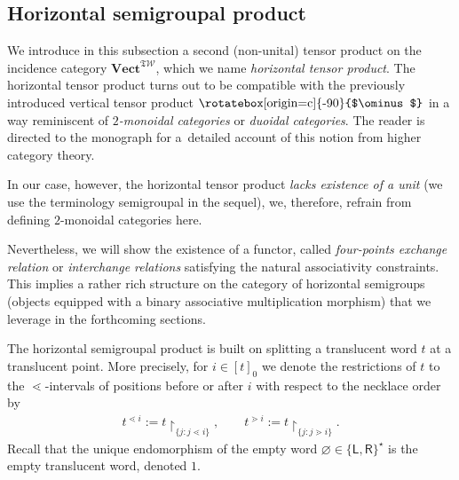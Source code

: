 \documentclass[pdftex]{sigma}
\newcommand\overt{\mathbin{\text{\rotatebox[origin=c]{-90}{$\ominus$}}}}
\renewcommand{\restriction}[2]{{#1\mathbin{\upharpoonright}_{#2}}}
\newcommand{\stdl}{\lessdot}
\newcommand{\stdg}{\gtrdot}
\newcommand{\SWc}{{\mathfrak{T}\mathcal{W}}}
\newcommand\LL{{\mathsf{L}}}
\newcommand\RR{{\mathsf{R}}}
\newcommand\CAT[1]{\mathbf{#1}}
\newcommand{\Vect}{\CAT{Vect}}
\newcommand\icsw{ \Vect^{\SWc} }
\numberwithin{equation}{section}
\begin{document}
\subsection{Horizontal semigroupal product}

We introduce in this subsection a second (non-unital) tensor product on the incidence category $\icsw$, which we name \emph{horizontal tensor product}. The horizontal tensor product turns out to be compatible with the previously introduced vertical tensor product $\overt$ in a way reminiscent of \emph{$2$-monoidal categories} or \emph{duoidal categories}. The reader is directed to the monograph \cite{aguiar2010monoidal} for a~detailed account of this notion from higher category theory.

In our case, however, the horizontal tensor product \emph{lacks existence of a unit} (we use the terminology semigroupal in the sequel), we, therefore, refrain from defining $2$-monoidal categories here.

Nevertheless, we will show the existence of a functor, called \emph{four-points exchange relation} or \emph{interchange relations} satisfying the natural associativity constraints. This implies a rather rich structure on the category of horizontal semigroups (objects equipped with a binary associative multiplication morphism) that we leverage in the forthcoming sections.

The horizontal semigroupal product is built on splitting a translucent word $t$ at a translucent point.
More precisely, for $i\in [t]_0$ we denote the restrictions of $t$ to the $\stdl$-intervals of positions before or after $i$ with respect to the necklace order by
\begin{align*}
 t^{\stdl i}:=\restriction{t}{\{ j\colon j \stdl i \}},\qquad
 t^{\stdg i}:=\restriction{t}{\{ j\colon j \stdg i \}}.
\end{align*}
Recall that the unique endomorphism of the empty word $\varnothing\in\{\LL,\RR\}^{\star}$ is the empty translucent word, denoted $1$.
\end{document}
